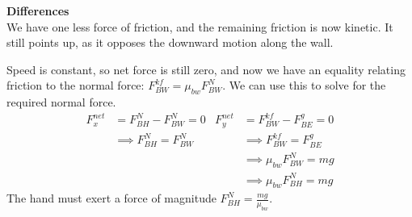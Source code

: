 \documentclass[]{article}
\begin{document}
\newpage
\begin{TeacherMargin}
\noindent\textbf{Differences} \\
We have one less force of friction, and the remaining friction is now kinetic. It still points up, as it opposes the downward motion along the wall.
\begin{center}
\end{center}
Speed is constant, so net force is still zero, and now we have an equality relating friction to the normal force: $F^{kf}_{BW} = \mu_{bw}F^{N}_{BW}$.  We can use this to solve for the required normal force.
\begin{align*}
	F^{net}_{x} & = F^{N}_{BH}-F^{N}_{BW} = 0 & F^{net}_{y} & = F^{kf}_{BW} - F^{g}_{BE} = 0 \\
	& \implies F^{N}_{BH} = F^{N}_{BW} & & \implies F^{kf}_{BW} = F^{g}_{BE} \\
	& & & \implies \mu_{bw}F^{N}_{BW} = mg \\
	& & & \implies \mu_{bw}F^{N}_{BH} = mg
\end{align*}
The hand must exert a force of magnitude $F^{N}_{BH} = \frac{mg}{\mu_{bw}}$. \\


\end{TeacherMargin}
\end{document}
